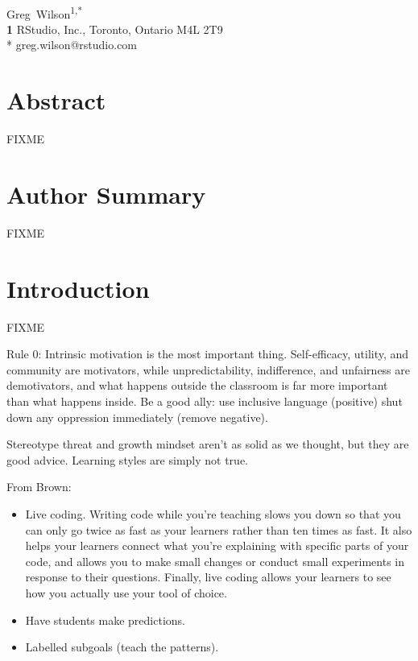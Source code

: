 \documentclass[10pt,letterpaper]{article}
\begin{document}
\vspace*{0.2in}

\begin{flushleft}
{\Large
\textbf{}
}
\newline
\\
{Greg~Wilson}\textsuperscript{1,*}
\\
\textbf{1} RStudio, Inc., Toronto, Ontario M4L 2T9
\\
\bigskip
* greg.wilson@rstudio.com
\end{flushleft}

\section*{Abstract}

FIXME

\section*{Author Summary}

FIXME

\section*{Introduction}

FIXME

Rule 0: Intrinsic motivation is the most important thing.
Self-efficacy, utility, and community are motivators,
while unpredictability, indifference, and unfairness are demotivators,
and what happens outside the classroom is far more important than what happens inside.
Be a good ally:
use inclusive language (positive)
shut down any oppression immediately (remove negative).

Stereotype threat and growth mindset aren't as solid as we thought,
but they are good advice.
Learning styles are simply not true.

From Brown:

\begin{itemize}

\item Live coding.
  Writing code while you're teaching slows you down so that you can only go twice as fast as your learners
  rather than ten times as fast.
  It also helps your learners connect what you're explaining with specific parts of your code,
  and allows you to make small changes or conduct small experiments in response to their questions.
  Finally,
  live coding allows your learners to see how you actually use your tool of choice.

\item Have students make predictions.

\item Labelled subgoals (teach the patterns).

\end{itemize}
\end{document}
